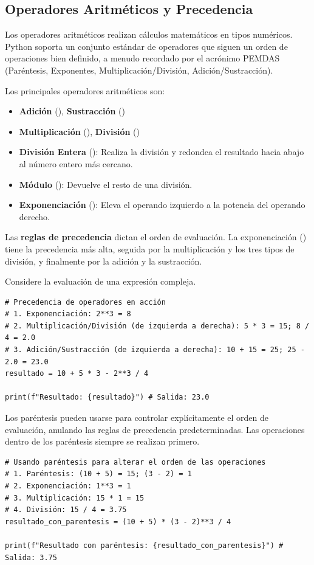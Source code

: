 \subsection{Operadores Aritméticos y Precedencia}
\label{subsec:arithmetic_operators}
Los operadores aritméticos realizan cálculos matemáticos en tipos numéricos. Python soporta un conjunto estándar de operadores que siguen un orden de operaciones bien definido, a menudo recordado por el acrónimo PEMDAS (Paréntesis, Exponentes, Multiplicación/División, Adición/Sustracción).

Los principales operadores aritméticos son:
\begin{itemize}
    \item \textbf{Adición} (\code{+}), \textbf{Sustracción} (\code{-})
    \item \textbf{Multiplicación} (\code{*}), \textbf{División} (\code{/})
    \item \textbf{División Entera} (\code{//}): Realiza la división y redondea el resultado hacia abajo al número entero más cercano.
    \item \textbf{Módulo} (\code{\%}): Devuelve el resto de una división.
    \item \textbf{Exponenciación} (\code{**}): Eleva el operando izquierdo a la potencia del operando derecho.
\end{itemize}

Las \textbf{reglas de precedencia} dictan el orden de evaluación. La exponenciación (\code{**}) tiene la precedencia más alta, seguida por la multiplicación y los tres tipos de división, y finalmente por la adición y la sustracción.

\begin{example}
Considere la evaluación de una expresión compleja.
\text{ }\begin{verbatim}
# Precedencia de operadores en acción
# 1. Exponenciación: 2**3 = 8
# 2. Multiplicación/División (de izquierda a derecha): 5 * 3 = 15; 8 / 4 = 2.0
# 3. Adición/Sustracción (de izquierda a derecha): 10 + 15 = 25; 25 - 2.0 = 23.0
resultado = 10 + 5 * 3 - 2**3 / 4

print(f"Resultado: {resultado}") # Salida: 23.0
\end{verbatim}
Los paréntesis \code{()} pueden usarse para controlar explícitamente el orden de evaluación, anulando las reglas de precedencia predeterminadas. Las operaciones dentro de los paréntesis siempre se realizan primero.
\text{ }\begin{verbatim}
# Usando paréntesis para alterar el orden de las operaciones
# 1. Paréntesis: (10 + 5) = 15; (3 - 2) = 1
# 2. Exponenciación: 1**3 = 1
# 3. Multiplicación: 15 * 1 = 15
# 4. División: 15 / 4 = 3.75
resultado_con_parentesis = (10 + 5) * (3 - 2)**3 / 4

print(f"Resultado con paréntesis: {resultado_con_parentesis}") # Salida: 3.75
\end{verbatim}
\end{example}

